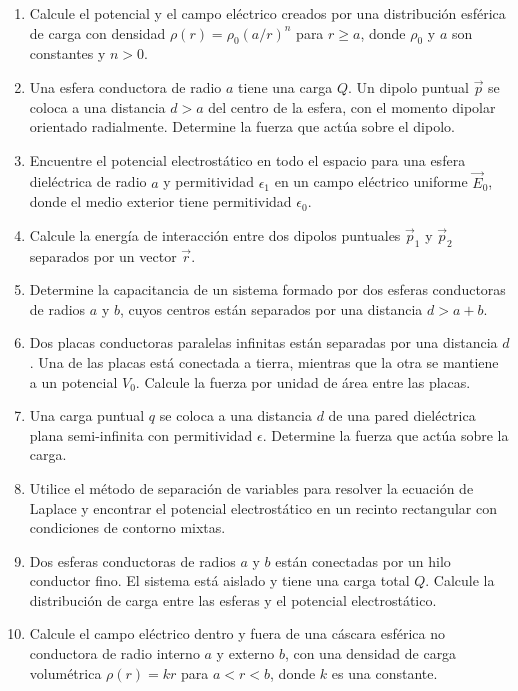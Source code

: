 \documentclass[12pt,a4paper]{book}
\begin{document}
\begin{enumerate}
\item Calcule el potencial y el campo eléctrico creados por una distribución esférica de carga con densidad $\rho(r) = \rho_0 (a/r)^n$ para $r \geq a$, donde $\rho_0$ y $a$ son constantes y $n > 0$.

\item Una esfera conductora de radio $a$ tiene una carga $Q$. Un dipolo puntual $\vec{p}$ se coloca a una distancia $d > a$ del centro de la esfera, con el momento dipolar orientado radialmente. Determine la fuerza que actúa sobre el dipolo.

\item Encuentre el potencial electrostático en todo el espacio para una esfera dieléctrica de radio $a$ y permitividad $\epsilon_1$ en un campo eléctrico uniforme $\vec{E}_0$, donde el medio exterior tiene permitividad $\epsilon_0$.

\item Calcule la energía de interacción entre dos dipolos puntuales $\vec{p}_1$ y $\vec{p}_2$ separados por un vector $\vec{r}$.

\item Determine la capacitancia de un sistema formado por dos esferas conductoras de radios $a$ y $b$, cuyos centros están separados por una distancia $d > a + b$.

\item Dos placas conductoras paralelas infinitas están separadas por una distancia $d$. Una de las placas está conectada a tierra, mientras que la otra se mantiene a un potencial $V_0$. Calcule la fuerza por unidad de área entre las placas.

\item Una carga puntual $q$ se coloca a una distancia $d$ de una pared dieléctrica plana semi-infinita con permitividad $\epsilon$. Determine la fuerza que actúa sobre la carga.

\item Utilice el método de separación de variables para resolver la ecuación de Laplace y encontrar el potencial electrostático en un recinto rectangular con condiciones de contorno mixtas.

\item Dos esferas conductoras de radios $a$ y $b$ están conectadas por un hilo conductor fino. El sistema está aislado y tiene una carga total $Q$. Calcule la distribución de carga entre las esferas y el potencial electrostático.

\item Calcule el campo eléctrico dentro y fuera de una cáscara esférica no conductora de radio interno $a$ y externo $b$, con una densidad de carga volumétrica $\rho(r) = kr$ para $a < r < b$, donde $k$ es una constante.


\end{enumerate}
\end{document}
